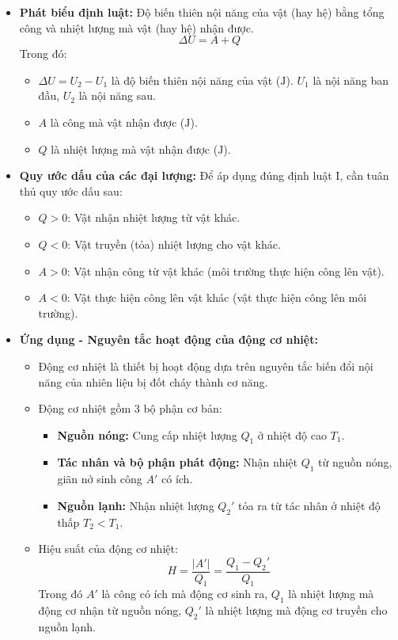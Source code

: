 \begin{itemize}
    \item \textbf{Phát biểu định luật:}
    Độ biến thiên nội năng của vật (hay hệ) bằng tổng công và nhiệt lượng mà vật (hay hệ) nhận được.
    \[
    \Delta U = A + Q
    \]
    Trong đó:
    \begin{itemize}
        \item $\Delta U = U_2 - U_1$ là độ biến thiên nội năng của vật ($\mathrm{J}$). $U_1$ là nội năng ban đầu, $U_2$ là nội năng sau.
        \item $A$ là công mà vật nhận được ($\mathrm{J}$).
        \item $Q$ là nhiệt lượng mà vật nhận được ($\mathrm{J}$).
    \end{itemize}
    \item \textbf{Quy ước dấu của các đại lượng:}
    Để áp dụng đúng định luật I, cần tuân thủ quy ước dấu sau:
    \begin{itemize}
        \item $Q > 0$: Vật nhận nhiệt lượng từ vật khác.
        \item $Q < 0$: Vật truyền (tỏa) nhiệt lượng cho vật khác.
        \item $A > 0$: Vật nhận công từ vật khác (môi trường thực hiện công lên vật).
        \item $A < 0$: Vật thực hiện công lên vật khác (vật thực hiện công lên môi trường).
    \end{itemize}

    \item \textbf{Ứng dụng - Nguyên tắc hoạt động của động cơ nhiệt:}
    \begin{itemize}
        \item Động cơ nhiệt là thiết bị hoạt động dựa trên nguyên tắc biến đổi nội năng của nhiên liệu bị đốt cháy thành cơ năng.
        \item Động cơ nhiệt gồm 3 bộ phận cơ bản:
        \begin{itemize}
            \item \textbf{Nguồn nóng:} Cung cấp nhiệt lượng $Q_1$ ở nhiệt độ cao $T_1$.
            \item \textbf{Tác nhân và bộ phận phát động:} Nhận nhiệt $Q_1$ từ nguồn nóng, giãn nở sinh công $A'$ có ích.
            \item \textbf{Nguồn lạnh:} Nhận nhiệt lượng $Q_2'$ tỏa ra từ tác nhân ở nhiệt độ thấp $T_2 < T_1$.
        \end{itemize}
        \item Hiệu suất của động cơ nhiệt:
        \[
        H = \dfrac{|A'|}{Q_1} = \dfrac{Q_1 - Q_2'}{Q_1}
        \]
        Trong đó $A'$ là công có ích mà động cơ sinh ra, $Q_1$ là nhiệt lượng mà động cơ nhận từ nguồn nóng, $Q_2'$ là nhiệt lượng mà động cơ truyền cho nguồn lạnh.
    \end{itemize}
\end{itemize}

